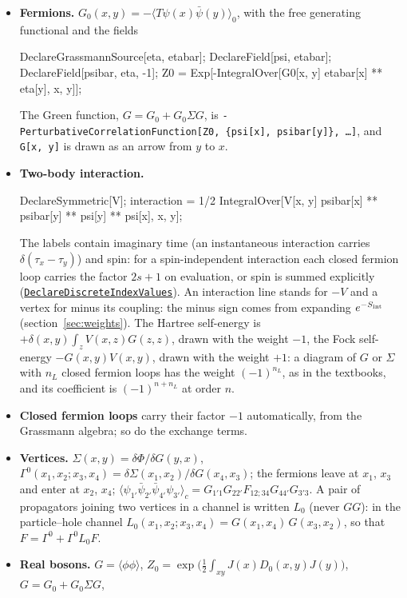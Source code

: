 \documentclass[11pt,a4paper]{article}
\newcommand{\pkg}[1]{\texttt{#1}}
\newcommand{\fnref}[1]{\hyperref[fn:#1]{\pkg{#1}}}
\begin{document}
\begin{itemize}
\item \textbf{Fermions.} $G_0(x,y)=-\langle T\psi(x)\bar\psi(y)\rangle_0$, with the free generating functional and the
  fields
\begin{code}
DeclareGrassmannSource[eta, etabar]; DeclareField[psi, etabar]; DeclareField[psibar, eta, -1];
Z0 = Exp[-IntegralOver[G0[x, y] etabar[x] ** eta[y], {x, y}]];
\end{code}
  The Green function, $G=G_0+G_0\Sigma G$, is \pkg{-PerturbativeCorrelationFunction[Z0, \{psi[x], psibar[y]\}, \dots]}, and
  \pkg{G[x, y]} is drawn as an arrow from $y$ to $x$.
\item \textbf{Two-body interaction.}
\begin{code}
DeclareSymmetric[V];
interaction = 1/2 IntegralOver[V[x, y] psibar[x] ** psibar[y] ** psi[y] ** psi[x], {x, y}];
\end{code}
  The labels contain imaginary time (an instantaneous interaction carries
  $\delta(\tau_x-\tau_y)$) and spin: for a spin-independent interaction each closed fermion loop carries the factor $2s+1$
  on evaluation, or spin is summed explicitly (\fnref{DeclareDiscreteIndexValues}). An interaction line stands for $-V$ and a vertex for minus its coupling: the minus
  sign comes from expanding $e^{-S_{\rm int}}$ (section~\ref{sec:weights}). The Hartree self-energy is
  $+\delta(x,y)\int_zV(x,z)G(z,z)$, drawn with the weight $-1$, the Fock self-energy $-G(x,y)V(x,y)$, drawn with the weight
  $+1$: a diagram of $G$ or $\Sigma$ with $n_L$ closed fermion loops has the weight $(-1)^{n_L}$, as in the textbooks,
  and its coefficient is $(-1)^{n+n_L}$ at order $n$.
\item \textbf{Closed fermion loops} carry their factor $-1$ automatically, from the Grassmann algebra; so do the exchange
  terms.
\item \textbf{Vertices.} $\Sigma(x,y)=\delta\Phi/\delta G(y,x)$, $\Gamma^0(x_1,x_2;x_3,x_4)=\delta\Sigma(x_1,x_2)/\delta G(x_4,x_3)$; the
  fermions leave at $x_1$, $x_3$ and enter at $x_2$, $x_4$;
  $\langle\psi_{1'}\bar\psi_{2'}\bar\psi_{4'}\psi_{3'}\rangle_c=G_{1'1}G_{22'}F_{12;34}G_{44'}G_{3'3}$. A pair of
  propagators joining two vertices in a channel is written $L_0$ (never $GG$): in the particle--hole channel
  $L_0(x_1,x_2;x_3,x_4)=G(x_1,x_4)\,G(x_3,x_2)$, so that $F=\Gamma^0+\Gamma^0L_0F$.
\item \textbf{Real bosons.} $G=\langle\phi\phi\rangle$, $Z_0=\exp\bigl(\frac12\int_{xy}J(x)D_0(x,y)J(y)\bigr)$, $G=G_0+G_0\Sigma G$,

\end{itemize}
\end{document}
